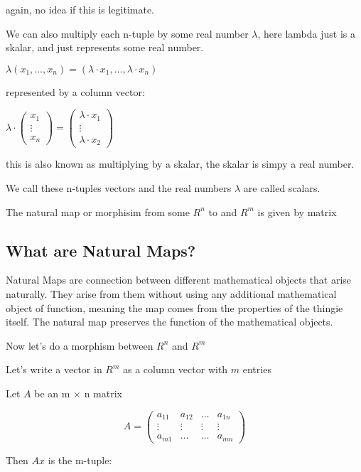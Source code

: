 \documentclass{article}
\begin{document}
again, no idea if this is legitimate.

We can also multiply each n-tuple by some real number $\lambda$, here lambda just is a skalar, and just represents some real number.

$\lambda(x_1, \ldots , x_n)=(\lambda \cdot x_1, \ldots, \lambda \cdot x_n)$

represented by a column vector:

$\lambda \cdot \begin{pmatrix} x_1 \\ \vdots \\ x_n \end{pmatrix} = \begin{pmatrix} \lambda \cdot x_1 \\ \vdots \\\lambda \cdot x_2 \end{pmatrix}$

this is also known as multiplying by a skalar, the skalar is simpy a real number.

We call these n-tuples vectors and the real numbers $\lambda$ are called scalars.


The natural map or morphisim from some $R^n$ to and $R^m$ is given by matrix

\subsection{What are Natural Maps?}

Natural Maps are connection between different mathematical objects that arise naturally.
They arise from them without using any additional mathematical object of function, meaning
the map comes from the properties of the thingie itself. The natural map preserves the function
of the mathematical objects.


Now let's do a morphism between $R^n$ and $R^m$

Let's write a vector in $R^m$ as a column vector with $m$ entries

Let $A$ be an m $\times$ n matrix



$$
A=\begin{pmatrix} a_{11} & a_{12} & \ldots & a_{1n} \\ \vdots & \vdots & \vdots & \vdots \\ a_{m1} & \ldots & \ldots & a_{mn} \end{pmatrix}
$$


Then $Ax$ is the m-tuple:
\end{document}
